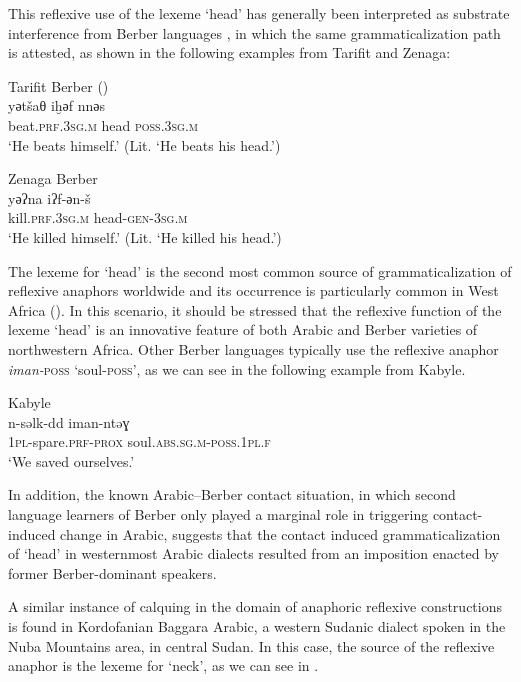\documentclass[output=paper]{langsci/langscibook}
\begin{document}
This reflexive use of the lexeme ‘head’ has generally been interpreted as substrate interference from Berber languages \citep[197]{ElAissati2011}, in which the same grammaticalization path is attested, as shown in the following examples from Tarifit and Zenaga: 

\ea\label{ex:key:}
{Tarifit Berber (\citealt[95]{Kossmann2000})}\\
\gll   yәtšaθ iḫәf nnәs\\
       beat.\textsc{prf.3sg.m} head \textsc{poss.3sg.m}\\
\glt   `He beats himself.' (Lit. ‘He beats his head.’)
\z

\ea\label{ex:key:}
{Zenaga Berber \citep[126]{Taine-Cheikh2008chapter}}\\
\gll   yәʔna iʔf-әn-š\\
       kill.\textsc{prf.3sg.m} head-\textsc{gen-3sg.m}\\
\glt   `He killed himself.' (Lit. ‘He killed his head.’)
\z

The lexeme for ‘head’ is the second most common source of grammaticalization of reflexive anaphors worldwide \citep{KönigTöpper2013} and its occurrence is particularly common in West Africa (\citealt[50]{Heine2011}). In this scenario, it should be stressed that the reflexive function of the lexeme ‘head’ is an innovative feature of both Arabic and Berber varieties of northwestern Africa. Other Berber languages typically use the reflexive anaphor \textit{iman-}\textsc{poss} ‘soul-\textsc{poss}’, as we can see in the following example from Kabyle.

\ea\label{ex:key:}
{Kabyle \citep{Mettouchi2012}}\\
\gll   n-səlk-dd       iman-ntəɣ\\
       \textsc{1pl}-spare.\textsc{prf-prox} soul.\textsc{abs.sg.m-poss.1pl.f}\\
\glt   `We saved ourselves.'\\
\z

In addition, the known Arabic–Berber contact situation, in which second language learners of Berber only played a marginal role in triggering contact-induced change in Arabic, suggests that the contact induced grammaticalization of ‘head’ in westernmost Arabic dialects resulted from an imposition enacted by former Berber-dominant speakers.  

A similar instance of calquing in the domain of anaphoric reflexive constructions is found in Kordofanian Baggara Arabic, a western Sudanic dialect spoken in the Nuba Mountains area, in central Sudan. In this case, the source of the reflexive anaphor is the lexeme for ‘neck’, as we can see in .  
\end{document}
